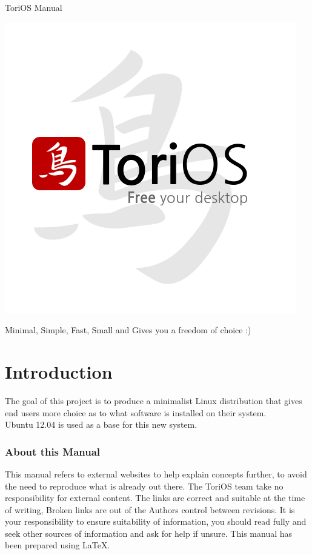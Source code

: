 \documentclass[12pt,a4paper]{book}
\author{Paul Sutton}
\begin{document}
\begin{center}
{\Huge ToriOS Manual}
\end{center}
\includegraphics{FinalLogo}

\begin{center}
Minimal, Simple, Fast, Small and Gives you a freedom of choice :)
\end{center}
\tableofcontents
\chapter{Introduction}
The goal of this project is to produce a minimalist Linux distribution that gives end users more choice as to what software is installed on their system.\\

Ubuntu 12.04 is used as a base for this new system.
\subsection{About this Manual}
This manual refers to external websites to help explain concepts further, to avoid the need to reproduce what is already out there.  The ToriOS team take no responsibility for external content.  The links are correct and suitable at the time of writing,  Broken links are out of the Authors control between revisions.  It is your responsibility to ensure suitability of information, you should read fully and seek other sources of information and ask for help if unsure.  
This manual has been prepared using \LaTeX. 
\end{document}
